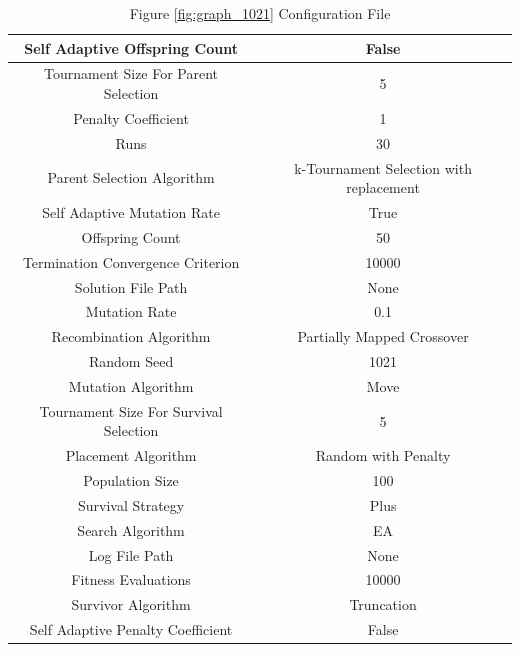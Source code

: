 \documentclass{standalone}
\begin{document}
\clearpage
\begin{table}[!htb]
	\centering
	\caption{Figure \ref{fig:graph_1021} Configuration File}
	\label{tab:graph_1021}
	\begin{tabular}{| c | c |}
		\hline
		Self Adaptive Offspring Count		& False		 \\
		\hline
		Tournament Size For Parent Selection		& 5		 \\
		\hline
		Penalty Coefficient		& 1		 \\
		\hline
		Runs		& 30		 \\
		\hline
		Parent Selection Algorithm		& k-Tournament Selection with replacement		 \\
		\hline
		Self Adaptive Mutation Rate		& True		 \\
		\hline
		Offspring Count		& 50		 \\
		\hline
		Termination Convergence Criterion		& 10000		 \\
		\hline
		Solution File Path		& None		 \\
		\hline
		Mutation Rate		& 0.1		 \\
		\hline
		Recombination Algorithm		& Partially Mapped Crossover		 \\
		\hline
		Random Seed		& 1021		 \\
		\hline
		Mutation Algorithm		& Move		 \\
		\hline
		Tournament Size For Survival Selection		& 5		 \\
		\hline
		Placement Algorithm		& Random with Penalty		 \\
		\hline
		Population Size		& 100		 \\
		\hline
		Survival Strategy		& Plus		 \\
		\hline
		Search Algorithm		& EA		 \\
		\hline
		Log File Path		& None		 \\
		\hline
		Fitness Evaluations		& 10000		 \\
		\hline
		Survivor Algorithm		& Truncation		 \\
		\hline
		Self Adaptive Penalty Coefficient		& False		 \\
		\hline
	\end{tabular}
\end{table}
\end{document}
